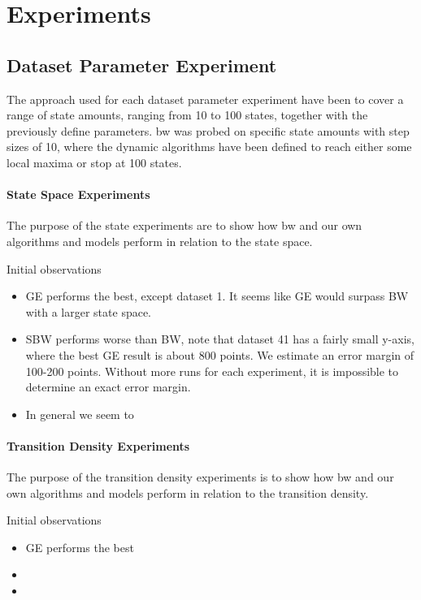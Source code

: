 \FloatBarrier

\section{Experiments}\label{sec:results}

\subsection{Dataset Parameter Experiment}
The approach used for each dataset parameter experiment have been to cover a range of state amounts, ranging from 10 to 100 states, together with the previously define parameters. \gls{bw} was probed on specific state amounts with step sizes of 10, where the dynamic algorithms have been defined to reach either some local maxima or stop at 100 states.

\paragraph{State Space Experiments}
The purpose of the state experiments are to show how \gls{bw} and our own algorithms and models perform in relation to the state space.

	

Initial observations
\begin{itemize}
\item GE performs the best, except dataset 1. It seems like GE would surpass BW with a larger state space.
\item SBW performs worse than BW, note that dataset 41 has a fairly small y-axis, where the best GE result is about 800 points. We estimate an error margin of 100-200 points. Without more runs for each experiment, it is impossible to determine an exact error margin.
\item In general we seem to 
\end{itemize}


\paragraph{Transition Density Experiments}
The purpose of the transition density experiments is to show how \gls{bw} and our own algorithms and models perform in relation to the transition density.

	

Initial observations
\begin{itemize}
\item GE performs the best
\item 
\item 
\end{itemize}

